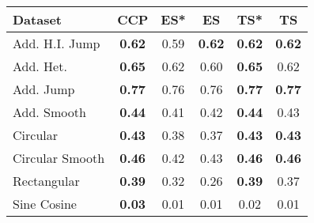 \begin{tabular}{lccccc}
\toprule
Dataset & CCP & ES* & ES & TS* & TS \\
\midrule
Add. H.I. Jump & \textbf{0.62} & 0.59 & \textbf{0.62} & \textbf{0.62} & \textbf{0.62} \\
Add. Het. & \textbf{0.65} & 0.62 & 0.60 & \textbf{0.65} & 0.62 \\
Add. Jump & \textbf{0.77} & 0.76 & 0.76 & \textbf{0.77} & \textbf{0.77} \\
Add. Smooth & \textbf{0.44} & 0.41 & 0.42 & \textbf{0.44} & 0.43 \\
Circular & \textbf{0.43} & 0.38 & 0.37 & \textbf{0.43} & \textbf{0.43} \\
Circular Smooth & \textbf{0.46} & 0.42 & 0.43 & \textbf{0.46} & \textbf{0.46} \\
Rectangular & \textbf{0.39} & 0.32 & 0.26 & \textbf{0.39} & 0.37 \\
Sine Cosine & \textbf{0.03} & 0.01 & 0.01 & 0.02 & 0.01 \\
\bottomrule
\end{tabular}